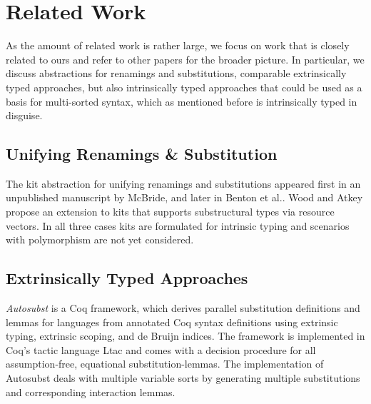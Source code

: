 \documentclass[a4paper, UKenglish, cleveref, autoref, thm-restate]{lipics-v2021}
\begin{document}
  \section{Related Work}
  \label{sec:related}




  As the amount of related work is rather large, we focus on work that
  is closely related to ours and refer to other papers for the
  broader
  picture\cite{DBLP:conf/cpp/StarkSK19,DBLP:journals/pacmpl/AllaisA0MM18}. In
  particular, we discuss abstractions for renamings
  and substitutions, comparable extrinsically typed approaches, but also
  intrinsically typed approaches that could be used as a basis for
  multi-sorted syntax, which as mentioned before is intrinsically typed
  in disguise.

  \subsection{Unifying Renamings \& Substitution}

  The kit abstraction for unifying renamings and substitutions
  appeared first in an unpublished manuscript by
  McBride\cite{unpublished:mcbride2005kits}, and later in
  Benton et al.\cite{DBLP:journals/jar/BentonHKM12}. 
  Wood and Atkey\cite{DBLP:journals/corr/abs-2005-02247} propose an
  extension to kits that supports substructural types via resource
  vectors.
  In all three cases kits are formulated for intrinsic typing
  and scenarios with polymorphism are not yet considered.

  \subsection{Extrinsically Typed Approaches}

  \emph{Autosubst}\cite{DBLP:conf/itp/SchaferTS15}
  is a Coq framework, which derives parallel substitution definitions and
  lemmas for languages from annotated Coq syntax definitions using
  extrinsic typing, extrinsic scoping, and de Bruijn indices.
  The framework is implemented in Coq's tactic language Ltac and comes
  with a decision procedure for all assumption-free, equational
  substitution-lemmas.
  The implementation of Autosubst deals with multiple variable sorts
  by generating multiple substitutions and corresponding interaction lemmas.
\end{document}
